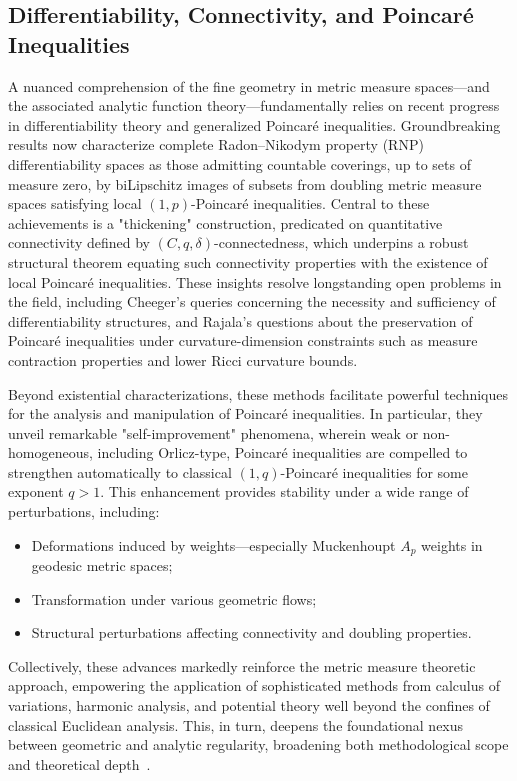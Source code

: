 \documentclass[sigconf]{acmart}
\begin{document}
\subsection{Differentiability, Connectivity, and Poincaré Inequalities}

A nuanced comprehension of the fine geometry in metric measure spaces—and the associated analytic function theory—fundamentally relies on recent progress in differentiability theory and generalized Poincaré inequalities. Groundbreaking results now characterize complete Radon–Nikodym property (RNP) differentiability spaces as those admitting countable coverings, up to sets of measure zero, by biLipschitz images of subsets from doubling metric measure spaces satisfying local $(1,p)$-Poincaré inequalities. Central to these achievements is a "thickening" construction, predicated on quantitative connectivity defined by $(C, q, \delta)$-connectedness, which underpins a robust structural theorem equating such connectivity properties with the existence of local Poincaré inequalities. These insights resolve longstanding open problems in the field, including Cheeger's queries concerning the necessity and sufficiency of differentiability structures, and Rajala's questions about the preservation of Poincaré inequalities under curvature-dimension constraints such as measure contraction properties and lower Ricci curvature bounds.

Beyond existential characterizations, these methods facilitate powerful techniques for the analysis and manipulation of Poincaré inequalities. In particular, they unveil remarkable "self-improvement" phenomena, wherein weak or non-homogeneous, including Orlicz-type, Poincaré inequalities are compelled to strengthen automatically to classical $(1, q)$-Poincaré inequalities for some exponent $q > 1$. This enhancement provides stability under a wide range of perturbations, including:

\begin{itemize}
    \item Deformations induced by weights—especially Muckenhoupt $A_p$ weights in geodesic metric spaces;
    \item Transformation under various geometric flows;
    \item Structural perturbations affecting connectivity and doubling properties.
\end{itemize}

Collectively, these advances markedly reinforce the metric measure theoretic approach, empowering the application of sophisticated methods from calculus of variations, harmonic analysis, and potential theory well beyond the confines of classical Euclidean analysis. This, in turn, deepens the foundational nexus between geometric and analytic regularity, broadening both methodological scope and theoretical depth~\cite{ref93}.
\end{document}
